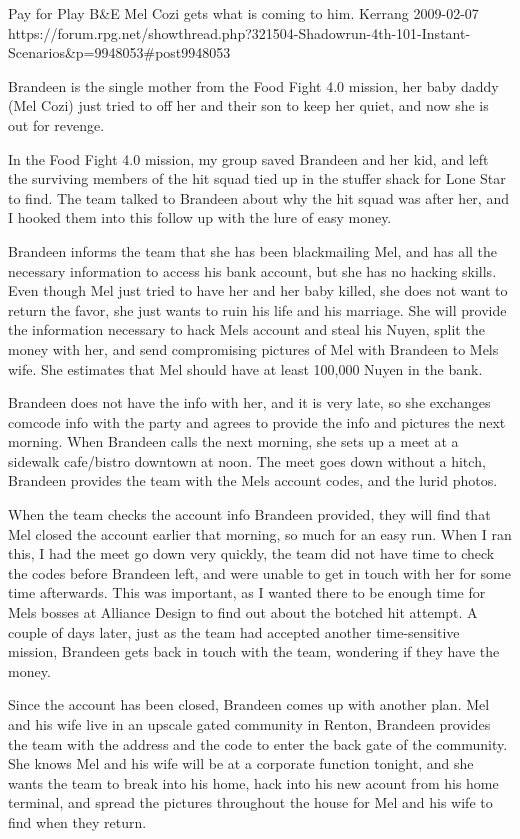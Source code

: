 \begin{scenario}{Pay for Play}
	{B\&E}
	{Mel Cozi gets what is coming to him.}
	{Kerrang}
	{2009-02-07}
	{https://forum.rpg.net/showthread.php?321504-Shadowrun-4th-101-Instant-Scenarios\&p=9948053\#post9948053}

 Brandeen is the single mother from the Food Fight 4.0 mission, her baby daddy (Mel Cozi) just tried to off her and their son to keep her quiet, and now she is out for revenge.

\synopsis In the Food Fight 4.0 mission, my group saved Brandeen and her kid, and left the surviving members of the hit squad tied up in the stuffer shack for Lone Star to find. The team talked to Brandeen about why the hit squad was after her, and I hooked them into this follow up with the lure of easy money.

Brandeen informs the team that she has been blackmailing Mel, and has all the necessary information to access his bank account, but she has no hacking skills. Even though Mel just tried to have her and her baby killed, she does not want to return the favor, she just wants to ruin his life and his marriage. She will provide the information necessary to hack Mels account and steal his Nuyen, split the money with her, and send compromising pictures of Mel with Brandeen to Mels wife. She estimates that Mel should have at least 100,000 Nuyen in the bank.

Brandeen does not have the info with her, and it is very late, so she exchanges comcode info with the party and agrees to provide the info and pictures the next morning. When Brandeen calls the next morning, she sets up a meet at a sidewalk cafe/bistro downtown at noon. The meet goes down without a hitch, Brandeen provides the team with the Mels account codes, and the lurid photos.

When the team checks the account info Brandeen provided, they will find that Mel closed the account earlier that morning, so much for an easy run. When I ran this, I had the meet go down very quickly, the team did not have time to check the codes before Brandeen left, and were unable to get in touch with her for some time afterwards. This was important, as I wanted there to be enough time for Mels bosses at Alliance Design to find out about the botched hit attempt. A couple of days later, just as the team had accepted another time-sensitive mission, Brandeen gets back in touch with the team, wondering if they have the money.

Since the account has been closed, Brandeen comes up with another plan. Mel and his wife live in an upscale gated community in Renton, Brandeen provides the team with the address and the code to enter the back gate of the community. She knows Mel and his wife will be at a corporate function tonight, and she wants the team to break into his home, hack into his new acount from his home terminal, and spread the pictures throughout the house for Mel and his wife to find when they return.


\end{scenario}
